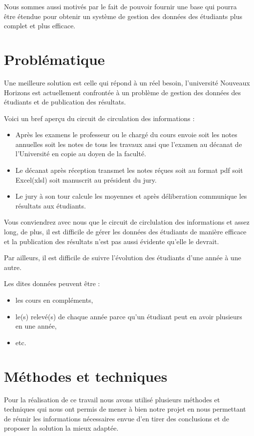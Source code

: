 Nous sommes aussi motivés par le fait de pouvoir fournir une base qui pourra être étendue
pour obtenir un système de gestion des données des étudiants plus complet et plus efficace.

\section{Problématique}\label{sec:problematique}
Une meilleure solution est celle qui répond à un réel besoin, l'université Nouveaux Horizons est actuellement confrontée à un problème
de gestion des données des étudiants et de publication des résultats.

Voici un bref aperçu du circuit de circulation des informations :

\begin{itemize}
    \item Après les examens le professeur ou le chargé du cours envoie soit
    les notes annuelles soit les notes de tous les travaux ansi que
    l'examen au décanat de l'Université en copie au doyen de la faculté.
    \item Le décanat après réception transmet les notes réçues soit
    au format pdf soit Excel(xlsl) soit manuscrit au président du jury.
    \item Le jury à son tour calcule les moyennes et après déliberation
    communique les résultats aux étudiants.
\end{itemize}

Vous conviendrez avec nous que le circuit de circlulation des
informations et assez long, de plus, il est difficile de
gérer les données des étudiants de manière efficace et la publication
des résultats n'est pas aussi évidente qu'elle le devrait.

Par ailleurs, il est difficile de suivre l'évolution des étudiants
d'une année à une autre.

Les dites données peuvent être :
\begin{itemize}
    \item les cours en compléments,
    \item le(s) relevé(s) de chaque année parce qu'un
    étudiant peut en avoir plusieurs en une année,
    \item etc.
\end{itemize}

\section{Méthodes et techniques}\label{sec:methode}
Pour la réalisation de ce travail nous avons utilisé plusieurs méthodes et techniques qui nous
ont permis de mener à bien notre projet en nous permettant de réunir les informations nécessaires
envue d'en tirer des conclusions et de proposer la solution la mieux adaptée.

